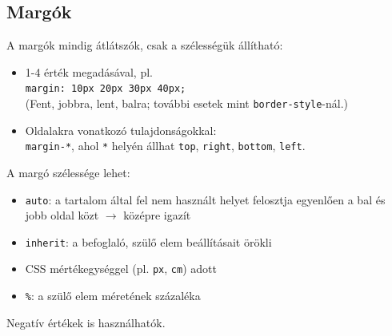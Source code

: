 \subsection{Margók}

\begin{frame}
  A margók mindig átlátszók, csak a szélességük állítható:
  \begin{itemize}
    \item 1-4 érték megadásával, pl.\\
    \texttt{margin: 10px 20px 30px 40px;}\\
    (Fent, jobbra, lent, balra; további esetek mint \texttt{border-style}-nál.)
    \item Oldalakra vonatkozó tulajdonságokkal:\\
      \texttt{margin-*}, ahol \texttt{*} helyén állhat 
      \texttt{top}, \texttt{right}, \texttt{bottom}, \texttt{left}.
  \end{itemize}
\end{frame}

\begin{frame}
  A margó szélessége lehet:
  \begin{itemize}
    \item \texttt{auto}: a tartalom által fel nem használt helyet felosztja egyenlően a bal és jobb oldal közt $\to$ középre igazít
    \item \texttt{inherit}: a befoglaló, szülő elem beállításait örökli
    \item CSS mértékegységgel (pl. \texttt{px}, \texttt{cm}) adott
    \item \texttt{\%}: a szülő elem méretének százaléka
  \end{itemize}
  \vfill
  Negatív értékek is használhatók.
\end{frame}

